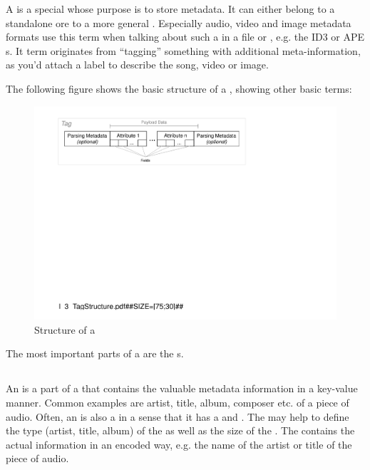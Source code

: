 A \TERMtag{} is a special \TERMcontainer{} whose purpose is to store metadata. It can either belong to a standalone \TERMmetadataFormat{} ore to a more general \TERMcontainerFormat{}. Especially audio, video and image metadata formats use this term when talking about such a \TERMdataBlock{} in a file or \TERMmediaStream{}, e.g. the ID3 or APE \TERMtag{}s. It term originates from ``tagging'' something with additional meta-information, as you'd attach a label to describe the song, video or image.

The following figure shows the basic structure of a \TERMtag{}, showing other basic terms:

\begin{figure}[H]
\centering
\includegraphics[width=1.00\textwidth]{figures/I_TagStructure.pdf}
\caption{Structure of a \TERMtag{}}
\label{fig:5_3_SCH_Tag}
\end{figure}

The most important parts of a \TERMtag{} are the \TERMattribute{}s.


\subsection{\TERMattribute{}}
\label{sec:Attribute}

An \TERMattribute{} is a part of a \TERMtag{} that contains the valuable metadata information in a key-value manner. Common examples are artist, title, album, composer etc. of a piece of audio. Often, an \TERMattribute{} is also a \TERMcontainer{} in a sense that it has a \TERMheader{} and \TERMpayload{}. The \TERMheader{} may help to define the type (artist, title, album) of the \TERMattribute{} as well as the size of the \TERMpayload{}. The \TERMpayload{} contains the actual information in an encoded way, e.g. the name of the artist or title of the piece of audio.

